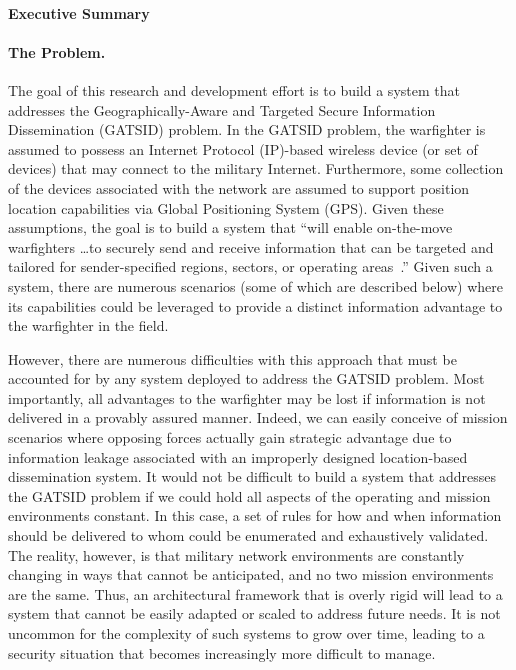 \documentclass{sbir}
\begin{document}
\paragraph{Executive Summary}
\paragraph{The Problem.} The goal of this research and development effort is to build a system that addresses the Geographically-Aware and Targeted Secure Information Dissemination (GATSID) problem. In the GATSID problem, the warfighter is assumed to possess an Internet Protocol (IP)-based wireless device (or set of devices) that may connect to the military Internet. Furthermore, some collection of the devices associated with the network are assumed to support position location capabilities via Global Positioning System (GPS). Given these assumptions, the goal is to build a system that ``will enable on-the-move warfighters \ldots to securely send and receive information that can be targeted and tailored for sender-specified regions, sectors, or operating areas~\cite{AF131-039}.'' Given such a system, there are numerous scenarios (some of which are described below) where its capabilities could be leveraged to provide a distinct information advantage to the warfighter in the field.

However, there are numerous difficulties with this approach that must be accounted for by any system deployed to address the GATSID problem. Most importantly, all advantages to the warfighter may be lost if information is not delivered in a provably assured manner. Indeed, we can easily conceive of mission scenarios where opposing forces actually gain strategic advantage due to information leakage associated with an improperly designed location-based dissemination system. It would not be difficult to build a system that addresses the GATSID problem if we could hold all aspects of the operating and mission environments constant. In this case, a set of rules for how and when information should be delivered to whom could be enumerated and exhaustively validated. The reality, however, is that military network environments are constantly changing in ways that cannot be anticipated, and no two mission environments are the same. Thus, an architectural framework that is overly rigid will lead to a system that cannot be easily adapted or scaled to address future needs. It is not uncommon for the complexity of such systems to grow over time, leading to a security situation that becomes increasingly more difficult to manage.
\end{document}
